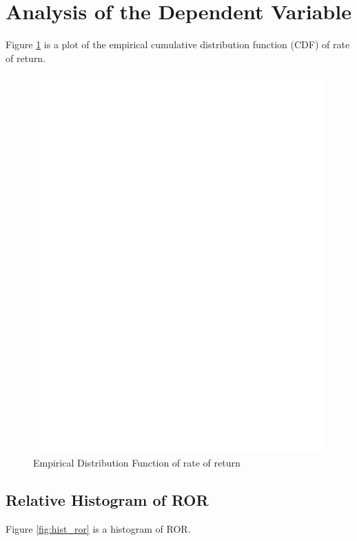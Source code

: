\documentclass[11pt]{paper}
\begin{document}
\section{Analysis of the Dependent Variable}



Figure  \ref{fig:ecdf_ror} is 
a plot of the empirical cumulative distribution function (CDF) of rate of return. 


\begin{figure}[h!]
  \centering
  \includegraphics[scale = 0.5, keepaspectratio=true]{../Figures/ecdf_ror}
  \caption{Empirical Distribution Function of rate of return} \label{fig:ecdf_ror}
\end{figure}

\subsection{Relative Histogram of ROR}

Figure \ref{fig:hist_ror} is 
a histogram of ROR. 
\end{document}
